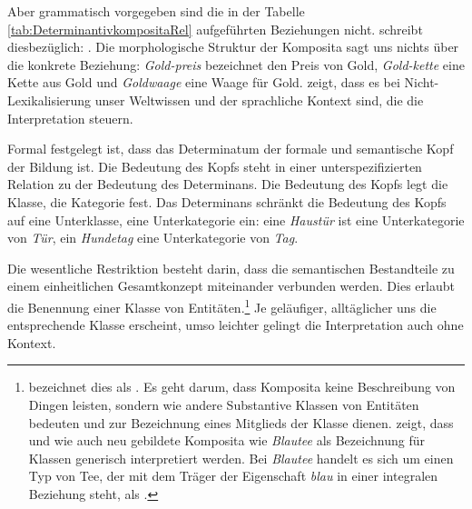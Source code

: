 Aber grammatisch vorgegeben sind die in der Tabelle \ref{tab:DeterminantivkompositaRel} aufgeführten Beziehungen nicht. \citet[3]{Heringer1984Fischfrau} schreibt diesbezüglich: . Die morphologische Struktur der Komposita sagt uns nichts über die konkrete Beziehung: \textit{Gold-preis} bezeichnet den Preis von Gold, \textit{Gold-kette} eine Kette aus Gold und \textit{Goldwaage} eine Waage für Gold. \citet[109, 117]{Coseriu1970} zeigt, dass es bei Nicht-Lexikalisierung unser Weltwissen und der sprachliche Kontext sind, die die Interpretation steuern. 

Formal festgelegt ist, dass das Determinatum der formale und semantische Kopf der Bildung ist. Die Bedeutung des Kopfs steht in einer unterspezifizierten Relation zu der Bedeutung des Determinans. Die Bedeutung des Kopfs legt die Klasse, die Kategorie fest. Das Determinans schränkt die Bedeutung des Kopfs auf eine Unterklasse, eine Unterkategorie ein: eine \textit{Haustür} ist eine Unterkategorie von \textit{Tür}, ein \textit{Hundetag} eine Unterkategorie von \textit{Tag}.  

Die wesentliche Restriktion besteht darin, dass die semantischen Bestandteile zu einem einheitlichen Gesamtkonzept miteinander verbunden werden. Dies erlaubt die Benennung einer Klasse von Entitäten.\footnote{\citet[88]{Olsen2001Kopulativ} bezeichnet dies als . Es geht darum, dass Komposita keine Beschreibung von Dingen leisten, sondern wie andere Substantive Klassen von Entitäten bedeuten und zur Bezeichnung eines Mitglieds der Klasse dienen. \citet[271--275]{Buecking2010} zeigt, dass und wie auch neu gebildete Komposita wie \textit{Blautee} als Bezeichnung für Klassen generisch interpretiert werden. Bei \textit{Blautee} handelt es sich um einen Typ von Tee, der mit dem Träger der Eigenschaft \textit{blau} in einer integralen Beziehung steht, \zB als .} Je geläufiger, alltäglicher uns die entsprechende Klasse erscheint, umso leichter gelingt die Interpretation auch ohne Kontext.

